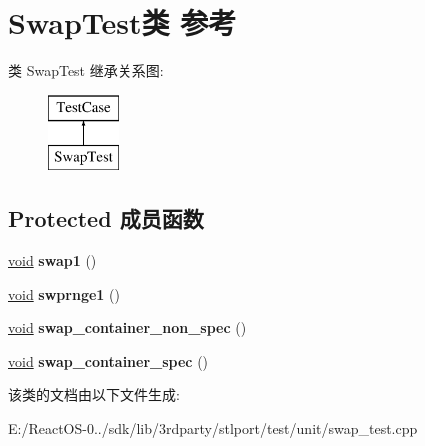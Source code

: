\hypertarget{class_swap_test}{}\section{Swap\+Test类 参考}
\label{class_swap_test}
类 Swap\+Test 继承关系图\+:\begin{figure}[H]
\begin{center}
\leavevmode
\includegraphics[height=2.000000cm]{class_swap_test}
\end{center}
\end{figure}
\subsection*{Protected 成员函数}
\begin{DoxyCompactItemize}
\item 
\mbox{\label{class_swap_test_aa028076c5218a3ed045a619110ccbb89}} 
\hyperlink{interfacevoid}{void} {\bfseries swap1} ()
\item 
\mbox{\label{class_swap_test_aa7ec7c4db98f9becb1d370110d4a4a32}} 
\hyperlink{interfacevoid}{void} {\bfseries swprnge1} ()
\item 
\mbox{\label{class_swap_test_a574c1a824917c510815e98e39f3c4fcb}} 
\hyperlink{interfacevoid}{void} {\bfseries swap\+\_\+container\+\_\+non\+\_\+spec} ()
\item 
\mbox{\label{class_swap_test_a3f29a4c6ea411dfb2bc55afb03acde27}} 
\hyperlink{interfacevoid}{void} {\bfseries swap\+\_\+container\+\_\+spec} ()
\end{DoxyCompactItemize}


该类的文档由以下文件生成\+:\begin{DoxyCompactItemize}
\item 
E\+:/\+React\+O\+S-\/0../sdk/lib/3rdparty/stlport/test/unit/swap\+\_\+test.\+cpp\end{DoxyCompactItemize}
